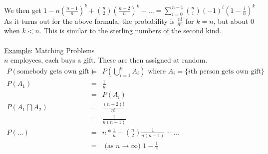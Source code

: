   We then get $1 - n\left(\frac{n-1}{n}\right)^k + \binom{n}{2}\left(
  \frac{n-2}{n}\right)^k - \ldots = \sum_{i = 0}^{n-1} \binom{n}{i} (-1)^i
  (1 - \frac{i}{n})^k$\\
  As it turns out for the above formula, the probability is $\frac{n!}{n^n}$
  for $k = n$, but about 0 when $k < n$. This is similar to the sterling 
  numbers of the second kind.\\\\
  \underline{Example}: Matching Problems\\
    $n$ employees, each buys a gift. These are then assigned at random.\\
    \begin{eqnarray*}
      P(\text{somebody gets own gift}) &=& P(\bigcup_{i=1}^{n}A_i) \text{ where } A_i = \{\text{$i$th person gets own gift}\}\\
      P(A_1) & = & \frac{1}{n}\\
      & = & P(A_i)\\
      P(A_1 \bigcap A_2) & = & \frac{(n-2)!}{n!} \\
      & = & \frac{1}{n(n-1)}\\
      P(\ldots) & = & n * \frac{1}{n} - \binom{n}{2}\frac{1}{n(n-1)} + \ldots \\
       & = & \text{ (as $n \to \infty$) } 1 - \frac{1}{e}
    \end{eqnarray*}
